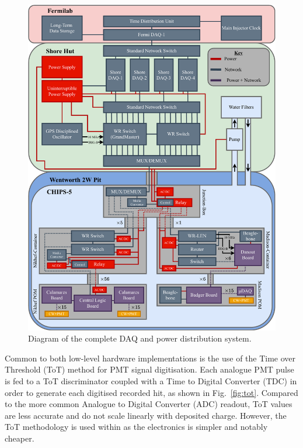 \begin{figure} %
    \includegraphics[width=\textwidth]{diagrams/5-daq/daq.pdf}
    \caption[Diagram of the complete \chipsfive data acquisition and power distribution system.]
    {Diagram of the complete \chipsfive DAQ and power distribution system.}
    \label{fig:daq}
\end{figure}

Common to both low-level hardware implementations is the use of the Time over Threshold (ToT)
method for PMT signal digitisation. Each analogue PMT pulse is fed to a ToT discriminator coupled
with a Time to Digital Converter (TDC) in order to generate each digitised recorded hit, as shown
in Fig.~\ref{fig:tot}. Compared to the more common Analogue to Digital Converter (ADC) readout,
ToT values are less accurate and do not scale linearly with deposited charge. However, the ToT
methodology is used within \chips as the electronics is simpler and notably cheaper.

